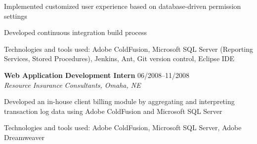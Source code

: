 \begin{itemize1}
\begin{itemize1}
			\item Implemented customized user experience based on database-driven permission settings
			\item Developed continuous integration build process
			\item Technologies and tools used: Adobe ColdFusion, Microsoft SQL Server (Reporting Services, Stored Procedures), Jenkins, Ant, Git version control, Eclipse IDE
		\end{itemize1}
	\item \textbf{Web Application Development Intern} \textopenbullet{} 06/2008--11/2008 \\
		\textit{Resource Insurance Consultants, Omaha, NE} \vspace{-1.5mm}
		\begin{itemize1}
			\item Developed an in-house client billing module by aggregating and interpreting transaction log data using Adobe ColdFusion and Microsoft SQL Server
			\item Technologies and tools used: Adobe ColdFusion, Microsoft SQL Server, Adobe Dreamweaver 
		\end{itemize1}
		

		

\end{itemize1}
